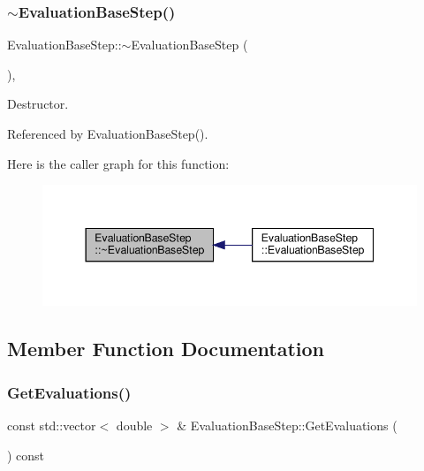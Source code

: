\subsubsection{\texorpdfstring{$\sim$\+Evaluation\+Base\+Step()}{~EvaluationBaseStep()}}
{\footnotesize\ttfamily Evaluation\+Base\+Step\+::$\sim$\+Evaluation\+Base\+Step (\begin{DoxyParamCaption}{ }\end{DoxyParamCaption})\hspace{0.3cm}{\ttfamily [override]}, {\ttfamily [default]}}



Destructor. 



Referenced by Evaluation\+Base\+Step().

Here is the caller graph for this function\+:
\nopagebreak
\begin{figure}[H]
\begin{center}
\leavevmode
\includegraphics[width=344pt]{d8/df3/classEvaluationBaseStep_a0e0f9b8e217918223fff80a768ac16fe_icgraph}
\end{center}
\end{figure}


\subsection{Member Function Documentation}
\mbox{\label{classEvaluationBaseStep_a2c34ab1d7778d72e77afd24865fda871}} 
\subsubsection{\texorpdfstring{Get\+Evaluations()}{GetEvaluations()}}
{\footnotesize\ttfamily const std\+::vector$<$ double $>$ \& Evaluation\+Base\+Step\+::\+Get\+Evaluations (\begin{DoxyParamCaption}{ }\end{DoxyParamCaption}) const}



